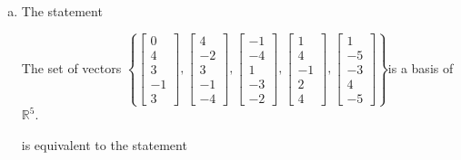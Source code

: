 \begin{exerciseAnswer}
\begin{enumerate}[(a)]
\item The statement 
\begin{center}\begin{minipage}{0.8\textwidth}
 The set of vectors \( \left\{ \left[\begin{array}{c}
0 \\
4 \\
3 \\
-1 \\
3
\end{array}\right] , \left[\begin{array}{c}
4 \\
-2 \\
3 \\
-1 \\
-4
\end{array}\right] , \left[\begin{array}{c}
-1 \\
-4 \\
1 \\
-3 \\
-2
\end{array}\right] , \left[\begin{array}{c}
1 \\
4 \\
-1 \\
2 \\
4
\end{array}\right] , \left[\begin{array}{c}
1 \\
-5 \\
-3 \\
4 \\
-5
\end{array}\right] \right\} \)is a basis of \(\mathbb{R}^5\). 
\end{minipage}\end{center}
     is equivalent to the statement 
\begin{center}\begin{minipage}{0.8\textwidth}
 The set of vectors \( \left\{ \left[\begin{array}{c}
0 \\
4 \\
3 \\
-1 \\
3
\end{array}\right] , \left[\begin{array}{c}
4 \\
-2 \\

\end{array}
\end{minipage}
\end{center}
\end{enumerate}
\end{exerciseAnswer}
